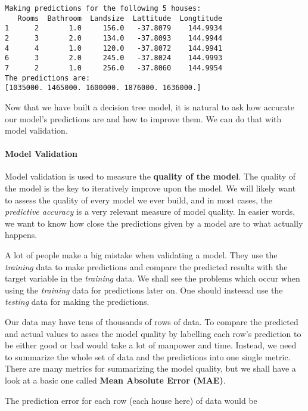 \documentclass[11pt]{article}
\begin{document}
    \begin{Verbatim}[commandchars=\\\{\}]
Making predictions for the following 5 houses:
   Rooms  Bathroom  Landsize  Lattitude  Longtitude
1      2       1.0     156.0   -37.8079    144.9934
2      3       2.0     134.0   -37.8093    144.9944
4      4       1.0     120.0   -37.8072    144.9941
6      3       2.0     245.0   -37.8024    144.9993
7      2       1.0     256.0   -37.8060    144.9954
The predictions are:
[1035000. 1465000. 1600000. 1876000. 1636000.]

    \end{Verbatim}

    Now that we have built a decision tree model, it is natural to ask how
accurate our model's predictions are and how to improve them. We can do
that with model validation.

    \hypertarget{model-validation}{%
\paragraph{Model Validation}\label{model-validation}}

    Model validation is used to measure the \textbf{quality of the model}.
The quality of the model is the key to iteratively improve upon the
model. We will likely want to assess the quality of every model we ever
build, and in most cases, the \emph{predictive accuracy} is a very
relevant measure of model quality. In easier words, we want to know how
close the predictions given by a model are to what actually happens.

A lot of people make a big mistake when validating a model. They use the
\emph{training} data to make predictions and compare the predicted
results with the target variable in the \emph{training} data. We shall
see the problems which occur when using the \emph{training} data for
predictions later on. One should insteead use the \emph{testing} data
for making the predictions.

Our data may have tens of thousands of rows of data. To compare the
predicted and actual values to asses the model quality by labelling each
row's prediction to be either good or bad would take a lot of manpower
and time. Instead, we need to summarize the whole set of data and the
predictions into one single metric. There are many metrics for
summarizing the model quality, but we shall have a look at a basic one
called \textbf{Mean Absolute Error (MAE)}.

The prediction error for each row (each house here) of data would be
\end{document}
